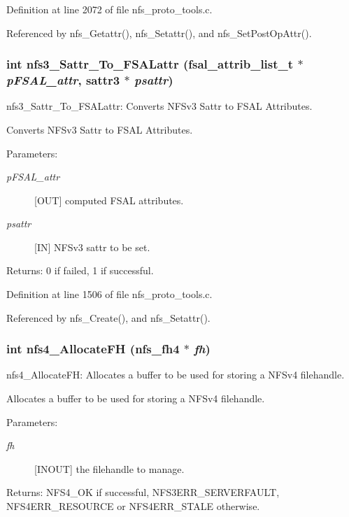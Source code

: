 Definition at line 2072 of file nfs\_\-proto\_\-tools.c.

Referenced by nfs\_\-Getattr(), nfs\_\-Setattr(), and nfs\_\-Set\-Post\-Op\-Attr().
\subsubsection{\setlength{\rightskip}{0pt plus 5cm}int nfs3\_\-Sattr\_\-To\_\-FSALattr (fsal\_\-attrib\_\-list\_\-t $\ast$ {\em p\-FSAL\_\-attr}, sattr3 $\ast$ {\em psattr})}\label{nfs__proto__tools_8c_a8}


nfs3\_\-Sattr\_\-To\_\-FSALattr: Converts NFSv3 Sattr to FSAL Attributes.

Converts NFSv3 Sattr to FSAL Attributes.

\begin{Desc}
\item[Parameters:]
\begin{description}
\item[{\em p\-FSAL\_\-attr}][OUT] computed FSAL attributes. \item[{\em psattr}][IN] NFSv3 sattr to be set.\end{description}
\end{Desc}
\begin{Desc}
\item[Returns:]0 if failed, 1 if successful. \end{Desc}


Definition at line 1506 of file nfs\_\-proto\_\-tools.c.

Referenced by nfs\_\-Create(), and nfs\_\-Setattr().
\subsubsection{\setlength{\rightskip}{0pt plus 5cm}int nfs4\_\-Allocate\-FH (nfs\_\-fh4 $\ast$ {\em fh})}\label{nfs__proto__tools_8c_a29}


nfs4\_\-Allocate\-FH: Allocates a buffer to be used for storing a NFSv4 filehandle.

Allocates a buffer to be used for storing a NFSv4 filehandle.

\begin{Desc}
\item[Parameters:]
\begin{description}
\item[{\em fh}][INOUT] the filehandle to manage.\end{description}
\end{Desc}
\begin{Desc}
\item[Returns:]NFS4\_\-OK if successful, NFS3ERR\_\-SERVERFAULT, NFS4ERR\_\-RESOURCE or NFS4ERR\_\-STALE otherwise. \end{Desc}


